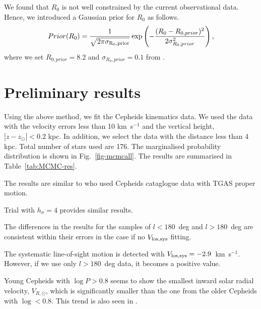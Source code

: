 \documentclass[11pt,a4paper]{article}
\begin{document}
We found that $R_0$ is not well constrained by the current observational data. Hence, we introduced a Gaussian prior for $R_0$ as follows.
\begin{equation}
 Prior(R_0)= \frac{1}{\sqrt{2 \pi \sigma_{\rm R_0,prior}}}  \exp\left(-\frac{(R_0-R_{0,prior})^2}{2 \sigma_{R_0,prior}^2}\right),
\end{equation}
where we set $R_{0,prior}=8.2$ and $\sigma_{R_0,prior}=0.1$ from \citep{rdggb16}.

\section{Preliminary results}

Using the above method, we fit the Cepheids kinematics data. We used the data with the velocity errors less than 10 km~s$^{-1}$ and the vertical height, $|z-z_{\odot}|<0.2$ kpc. In addition, we select the data with the distance less than 4 kpc. Total number of stars used are 176.  The marginalised probability distribution is shown in Fig.~\ref{fig-mcmcall}. The results are summarised in Table~\ref{tab:MCMC-res}.

The results are similar to \citet{vvb17a} who used Cepheids cataglogue data with TGAS proper motion. 

Trial with $h_{\sigma}=4$ provides similar results. 

The differences in the results for the samples of $l<180$~deg and $l>180$~deg are consistent within their errors in the case if no $V_{\rm los,sys}$ fitting. 

The systematic line-of-sight motion is detected with $V_{\rm los,sys}=-2.9$~km~s$^{-1}$. However, if we use only $l>180$~deg data, it becomes a positive value. 

Young Cepheids with $\log P>0.8$ seems to show the smallest inward solar radial velocity, $V_{R,\odot}$, which is significantly smaller than the one from the older Cepheids with $\log<0.8$. This trend is also seen in \citet{vvb17a}.
\end{document}

